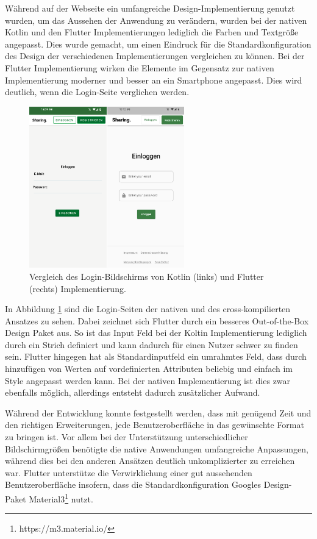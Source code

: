 Während auf der Webseite ein umfangreiche Design-Implementierung genutzt wurden, um das Aussehen der Anwendung zu verändern, wurden bei der nativen Kotlin und den Flutter Implementierungen lediglich die Farben und Textgröße angepasst. Dies wurde gemacht, um einen Eindruck für die Standardkonfiguration des Design der verschiedenen Implementierungen vergleichen zu können. Bei der Flutter Implementierung wirken die Elemente im Gegensatz zur nativen Implementierung moderner und besser an ein Smartphone angepasst. Dies wird deutlich, wenn die Login-Seite verglichen werden.

\begin{figure}[ht]
  \centering
  \includegraphics[height=7cm,keepaspectratio]{images/Login_vergleich.png} 
  \caption[Vergleich des Login-Bildschirms von Kotlin und Flutter Implementierung.]{Vergleich des Login-Bildschirms von Kotlin (links) und Flutter (rechts) Implementierung.}
  \label{fig:loginscreen}
\end{figure}

In Abbildung \ref{fig:loginscreen} sind die Login-Seiten der nativen und des cross-kompilierten Ansatzes zu sehen. Dabei zeichnet sich Flutter durch ein besseres Out-of-the-Box Design Paket aus. So ist das Input Feld bei der Koltin Implementierung  lediglich durch ein Strich definiert und kann dadurch für einen Nutzer schwer zu finden sein. Flutter hingegen hat als Standardinputfeld ein umrahmtes Feld, dass durch hinzufügen von Werten auf vordefinierten Attributen beliebig und einfach im Style angepasst werden kann. Bei der nativen Implementierung ist dies zwar ebenfalls möglich, allerdings entsteht dadurch zusätzlicher Aufwand.

Während der Entwicklung konnte festgestellt werden, dass mit genügend Zeit und den richtigen Erweiterungen, jede Benutzeroberfläche in das gewünschte Format zu bringen ist. Vor allem bei der Unterstützung unterschiedlicher Bildschirmgrößen benötigte die native Anwendungen umfangreiche Anpassungen, während dies bei den anderen Ansätzen deutlich unkomplizierter zu erreichen war. Flutter unterstütze die Verwirklichung einer gut aussehenden Benutzeroberfläche insofern, dass die Standardkonfiguration Googles Design-Paket Material3\footnote{https://m3.material.io/} nutzt.

